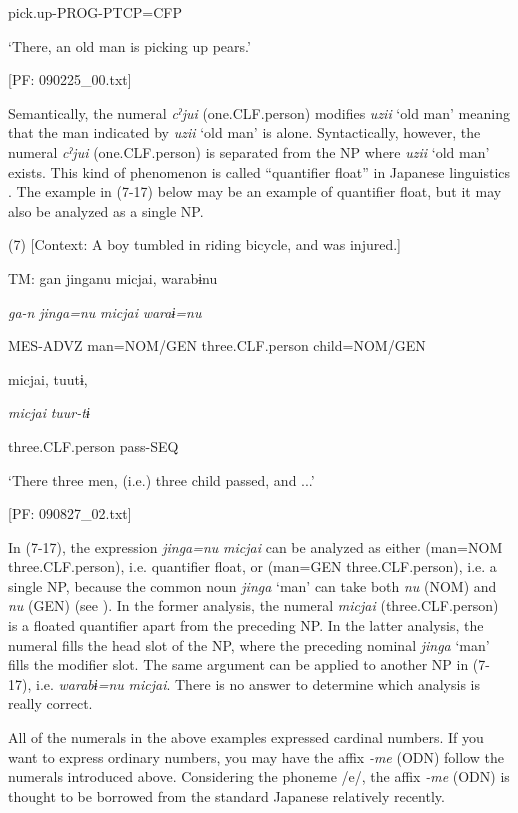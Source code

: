     pick.up-PROG-PTCP=CFP

    ‘There, an old man is picking up pears.’

    [PF: 090225\_00.txt]

Semantically, the numeral \textit{cˀjui} (one.CLF.person) modifies \textit{uzii} ‘old man’ meaning that the man indicated by \textit{uzii} ‘old man’ is alone. Syntactically, however, the numeral \textit{cˀjui} (one.CLF.person) is separated from the NP where \textit{uzii} ‘old man’ exists. This kind of phenomenon is called “quantifier float” in Japanese linguistics \citep[286]{Shibatani1990}. The example in (7-17) below may be an example of quantifier float, but it may also be analyzed as a single NP.

(7)  [Context: A boy tumbled in riding bicycle, and was injured.]

  TM:  gan  jinganu  micjai,  warabɨnu

    \textit{ga-n}  \textit{jinga=nu}  \textit{micjai}  \textit{waraɨ=nu}

    MES-ADVZ  man=NOM/GEN  three.CLF.person  child=NOM/GEN

    micjai,  tuutɨ,

    \textit{micjai}  \textit{tuur-tɨ}

    three.CLF.person  pass-SEQ

    ‘There three men, (i.e.) three child passed, and ...’

    [PF: 090827\_02.txt]

In (7-17), the expression \textit{jinga=nu} \textit{micjai} can be analyzed as either (man=NOM three.CLF.person), i.e. quantifier float, or (man=GEN three.CLF.person), i.e. a single NP, because the common noun \textit{jinga} ‘man’ can take both \textit{nu} (NOM) and \textit{nu} (GEN) (see ). In the former analysis, the numeral \textit{micjai} (three.CLF.person) is a floated quantifier apart from the preceding NP. In the latter analysis, the numeral fills the head slot of the NP, where the preceding nominal \textit{jinga} ‘man’ fills the modifier slot. The same argument can be applied to another NP in (7-17), i.e. \textit{warabɨ=nu} \textit{micjai}. There is no answer to determine which analysis is really correct.

  All of the numerals in the above examples expressed cardinal numbers. If you want to express ordinary numbers, you may have the affix \textit{{}-me} (ODN) follow the numerals introduced above. Considering the phoneme /e/, the affix \textit{{}-me} (ODN) is thought to be borrowed from the standard Japanese relatively recently.

